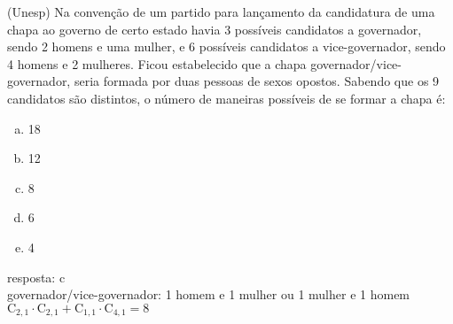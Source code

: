 \begin{ex}
 	(Unesp) Na convenção de um partido para lançamento da candidatura de uma chapa ao governo de certo estado havia 3 possíveis candidatos a governador, sendo 2 homens e uma mulher, e 6 possíveis candidatos a vice-governador, sendo 4 homens e 2 mulheres. Ficou estabelecido que a chapa governador/vice-governador, seria formada por duas pessoas de sexos opostos. Sabendo que os 9 candidatos são distintos, o número de maneiras possíveis de se formar a chapa é:
    \begin{enumerate}[(a)]
    \item 18
    \item 12
    \item 8
    \item 6
    \item 4
    \end{enumerate}
      \begin{sol}
       resposta: c \\
       governador/vice-governador: 1 homem e 1 mulher ou 1 mulher e 1 homem \\
       $\mathrm{C}_{2,1}\cdot\mathrm{C}_{2,1}+\mathrm{C}_{1,1}\cdot\mathrm{C}_{4,1}=8$
      \end{sol}
\end{ex}